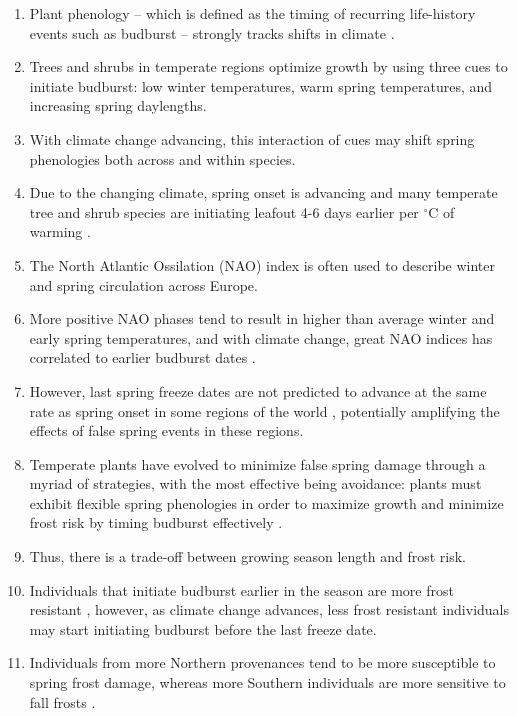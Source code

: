 \documentclass{article}\usepackage[]{graphicx}\usepackage[]{color}
\begin{document}
\begin{enumerate}
\item Plant phenology -- which is defined as the timing of recurring life-history events such as budburst -- strongly tracks shifts in climate \citep{Wolkovich2012}.
\item Trees and shrubs in temperate regions optimize growth by using three cues to initiate budburst: low winter temperatures, warm spring temperatures, and increasing spring daylengths.
\item With climate change advancing, this interaction of cues may shift spring phenologies both across and within species. 
\item Due to the changing climate, spring onset is advancing and many temperate tree and shrub species are initiating leafout 4-6 days earlier per $^{\circ}$C of warming \citep{Wolkovich2012, Polgar2014}.
\item The North Atlantic Ossilation (NAO) index is often used to describe winter and spring circulation across Europe. 
\item More positive NAO phases tend to result in higher than average winter and early spring temperatures, and with climate change, great NAO indices has correlated to earlier budburst dates \citep{Chmielewski2001}.
\item However, last spring freeze dates are not predicted to advance at the same rate as spring onset in some regions of the world \citep{Inouye2008, Martin2010, Labe2016, Sgubin2018}, potentially amplifying the effects of false spring events in these regions.

\item Temperate plants have evolved to minimize false spring damage through a myriad of strategies, with the most effective being avoidance: plants must exhibit flexible spring phenologies in order to maximize growth and minimize frost risk by timing budburst effectively \citep{Polgar2011, Basler2014}.
\item Thus, there is a trade-off between growing season length and frost risk. 
\item Individuals that initiate budburst earlier in the season are more frost resistant \citep{Korner2016}, however, as climate change advances, less frost resistant individuals may start initiating budburst before the last freeze date.

\item Individuals from more Northern provenances tend to be more susceptible to spring frost damage, whereas more Southern individuals are more sensitive to fall frosts \citep{Montwe2018}.



\end{enumerate}
\end{document}
